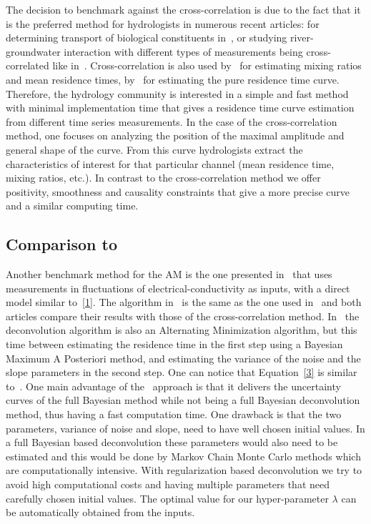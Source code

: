 \documentclass[]{elsarticle} %
\begin{document}
The decision to benchmark against the cross-correlation is due to the fact that it is the preferred method for hydrologists in numerous recent articles: for determining transport of biological constituents in~\cite{Sheets2002}, or studying river-groundwater interaction with different types of measurements being cross-correlated like in~\cite{HoehnCirpka2006}. Cross-correlation is also used by~\cite{Vogt2010} for estimating mixing ratios and mean residence times, by~\cite{Z_Hydro_Delbart_2014} for estimating the pure residence time curve. Therefore, the hydrology community is interested in a simple and fast method with minimal implementation time that gives a residence time curve estimation from different time series measurements. In the case of the cross-correlation method, one focuses on analyzing the position of the maximal amplitude and general shape of the curve. From this curve hydrologists extract the characteristics of interest for that particular channel (mean residence time, mixing ratios, etc.). In contrast to the cross-correlation method we offer positivity, smoothness and causality constraints that give a more precise curve and a similar computing time.


\subsection{Comparison to\texorpdfstring{~\cite{Z_Hydro_Cirpka2007}}{Cirpka Method}}

Another benchmark method for the AM is the one presented in~\cite{Z_Hydro_Cirpka2007} that uses measurements in fluctuations of electrical-conductivity as inputs, with a direct model similar to~\eqref{1}.
The algorithm in~\cite{Z_Hydro_Cirpka2007} is the same as the one used in~\cite{Vogt2010} and both articles compare their results with those of the cross-correlation method. In~\cite{Z_Hydro_Cirpka2007} the deconvolution algorithm is also an Alternating Minimization algorithm, but this time between estimating the residence time in the first step using a Bayesian Maximum A Posteriori method, and estimating the variance of the noise and the slope parameters in the second step. One can notice that Equation~\eqref{3} is similar to~\cite[Eq.(8)]{Z_Hydro_Cirpka2007}.
One main advantage of the~\cite{Z_Hydro_Cirpka2007} approach is that it delivers the uncertainty curves of the full Bayesian method while not being a full Bayesian deconvolution method, thus having a fast computation time. One drawback is that the two parameters, variance of noise and slope, need to have well chosen initial values. In a full Bayesian based deconvolution these parameters would also need to be estimated and this would be done by Markov Chain Monte Carlo methods which are computationally intensive. With regularization based deconvolution we try to avoid high computational costs and having multiple parameters that need carefully chosen initial values. The optimal value for our hyper-parameter $\lambda$ can be automatically obtained from the inputs.
\end{document}
